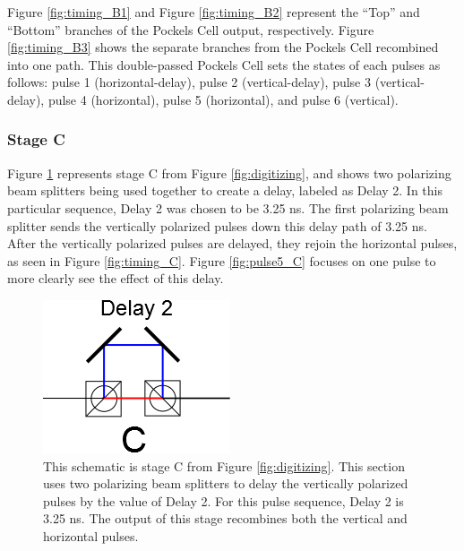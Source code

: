 \documentclass[pdftex,12pt,a4paper]{article}
\begin{document}
Figure \ref{fig:timing_B1} and Figure \ref{fig:timing_B2} represent the ``Top'' and ``Bottom'' branches of the Pockels Cell output, respectively. Figure \ref{fig:timing_B3} shows the separate branches from the Pockels Cell recombined into one path. This double-passed Pockels Cell sets the states of each pulses as follows: pulse 1 (horizontal-delay), pulse 2 (vertical-delay), pulse 3 (vertical-delay), pulse 4 (horizontal), pulse 5 (horizontal), and pulse 6 (vertical). 

\subsubsection*{Stage C}

Figure \ref{fig:stageC} represents stage C from Figure \ref{fig:digitizing}, and shows two polarizing beam splitters being used together to create a delay, labeled as Delay 2. In this particular sequence, Delay 2 was chosen to be 3.25 ns. The first polarizing beam splitter sends the vertically polarized pulses down this delay path of 3.25 ns. After the vertically polarized pulses are delayed, they rejoin the horizontal pulses, as seen in Figure \ref{fig:timing_C}. Figure \ref{fig:pulse5_C} focuses on one pulse to more clearly see the effect of this delay.

\begin{figure}[H]
\centering
\includegraphics[scale=.7]{stageC.png} 
\caption{This schematic is stage C from Figure \ref{fig:digitizing}. This section uses two polarizing beam splitters to delay the vertically polarized pulses by the value of Delay 2. For this pulse sequence, Delay 2 is 3.25 ns. The output of this stage recombines both the vertical and horizontal pulses.}
\label{fig:stageC}
\end{figure}
\end{document}
